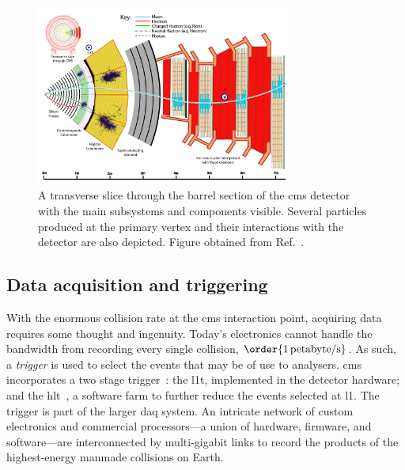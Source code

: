 \begin{figure}[htbp]
    \centering
    \includegraphics[width=0.75\textwidth]{figures/Transverse_slice_CMS.pdf}
    \caption[A transverse slice through the barrel section of the CMS detector with the main subsystems and components visible]{A transverse slice through the barrel section of the \acrshort{cms} detector with the main subsystems and components visible. Several particles produced at the primary vertex and their interactions with the detector are also depicted. Figure obtained from Ref.~.}
    \label{fig:detector_cms_transverse}
\end{figure}





\subsection{Data acquisition and triggering}
\label{subsec:cms_recording_data}

With the enormous collision rate at the \acrshort{cms} interaction point, acquiring data requires some thought and ingenuity. Today's electronics cannot handle the bandwidth from recording every single collision, $\order{\text{1\,petabyte/s}}$. As such, a \emph{trigger} is used to select the events that may be of use to analysers. \acrshort{cms} incorporates a two stage trigger~\cite{Bayatyan:706847}: the \acrfull{l1t}, implemented in the detector hardware; and the \acrfull{hlt}~\cite{Cittolin:578006}, a software farm to further reduce the events selected at \acrlong{l1}. The trigger is part of the larger \acrfull{daq} system. An intricate network of custom electronics and commercial processors---a union of hardware, firmware, and software---are interconnected by multi-gigabit links to record the products of the highest-energy manmade collisions on Earth.


